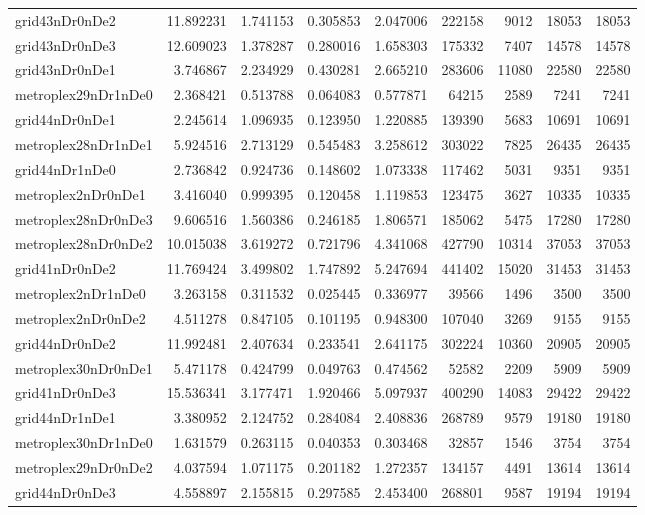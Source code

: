 \documentclass[../../../thesis.tex]{subfiles}
\begin{document}
\begin{longtable}{|l|r|r|r|r|r|r|r|r|}
grid43nDr0nDe2 & 11.892231 & 1.741153 & 0.305853 & 2.047006 & 222158 & 9012 & 18053 & 18053 \\
grid43nDr0nDe3 & 12.609023 & 1.378287 & 0.280016 & 1.658303 & 175332 & 7407 & 14578 & 14578 \\
grid43nDr0nDe1 & 3.746867 & 2.234929 & 0.430281 & 2.665210 & 283606 & 11080 & 22580 & 22580 \\
metroplex29nDr1nDe0 & 2.368421 & 0.513788 & 0.064083 & 0.577871 & 64215 & 2589 & 7241 & 7241 \\
grid44nDr0nDe1 & 2.245614 & 1.096935 & 0.123950 & 1.220885 & 139390 & 5683 & 10691 & 10691 \\
metroplex28nDr1nDe1 & 5.924516 & 2.713129 & 0.545483 & 3.258612 & 303022 & 7825 & 26435 & 26435 \\
grid44nDr1nDe0 & 2.736842 & 0.924736 & 0.148602 & 1.073338 & 117462 & 5031 & 9351 & 9351 \\
metroplex2nDr0nDe1 & 3.416040 & 0.999395 & 0.120458 & 1.119853 & 123475 & 3627 & 10335 & 10335 \\
metroplex28nDr0nDe3 & 9.606516 & 1.560386 & 0.246185 & 1.806571 & 185062 & 5475 & 17280 & 17280 \\
metroplex28nDr0nDe2 & 10.015038 & 3.619272 & 0.721796 & 4.341068 & 427790 & 10314 & 37053 & 37053 \\
grid41nDr0nDe2 & 11.769424 & 3.499802 & 1.747892 & 5.247694 & 441402 & 15020 & 31453 & 31453 \\
metroplex2nDr1nDe0 & 3.263158 & 0.311532 & 0.025445 & 0.336977 & 39566 & 1496 & 3500 & 3500 \\
metroplex2nDr0nDe2 & 4.511278 & 0.847105 & 0.101195 & 0.948300 & 107040 & 3269 & 9155 & 9155 \\
grid44nDr0nDe2 & 11.992481 & 2.407634 & 0.233541 & 2.641175 & 302224 & 10360 & 20905 & 20905 \\
metroplex30nDr0nDe1 & 5.471178 & 0.424799 & 0.049763 & 0.474562 & 52582 & 2209 & 5909 & 5909 \\
grid41nDr0nDe3 & 15.536341 & 3.177471 & 1.920466 & 5.097937 & 400290 & 14083 & 29422 & 29422 \\
grid44nDr1nDe1 & 3.380952 & 2.124752 & 0.284084 & 2.408836 & 268789 & 9579 & 19180 & 19180 \\
metroplex30nDr1nDe0 & 1.631579 & 0.263115 & 0.040353 & 0.303468 & 32857 & 1546 & 3754 & 3754 \\
metroplex29nDr0nDe2 & 4.037594 & 1.071175 & 0.201182 & 1.272357 & 134157 & 4491 & 13614 & 13614 \\
grid44nDr0nDe3 & 4.558897 & 2.155815 & 0.297585 & 2.453400 & 268801 & 9587 & 19194 & 19194 \\

\end{longtable}
\end{document}
